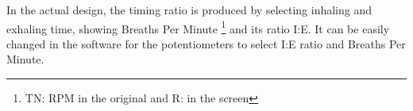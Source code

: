     In the actual design, the timing ratio is produced by selecting inhaling and exhaling time, showing Breaths Per Minute \footnote{TN: RPM in the original and R: in the screen} and its ratio I:E. It can be easily changed in the software for the potentiometers to select I:E ratio and Breaths Per Minute.
